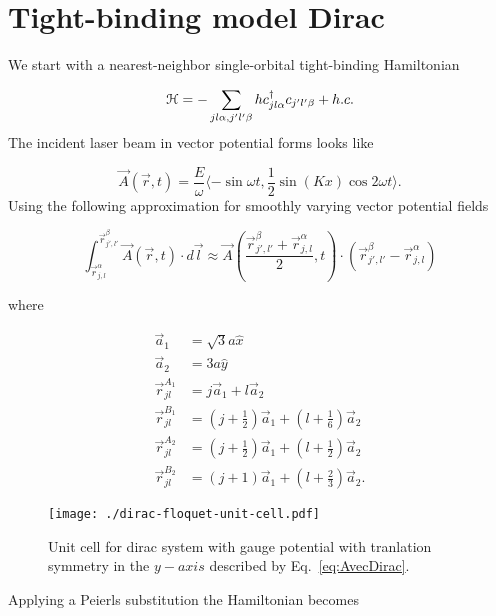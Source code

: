 \section{Tight-binding model Dirac}\label{app:tbm-dirac}

We start with a nearest-neighbor single-orbital tight-binding Hamiltonian

\begin{equation}
  \mathcal{H} = - \sum_{jl\alpha,j'l'\beta} h c^{\dagger}_{jl\alpha} c_{j'l'\beta} + h.c.
\end{equation}
The incident laser beam in vector potential forms looks like

\begin{equation} \label{eq:AvecDirac}
  \vec{A}(\vec{r},t) = \dfrac{E}{\omega} \langle -\sin \omega t, \dfrac{1}{2} \sin(Kx) \cos 2\omega t \rangle.
\end{equation}
Using the following approximation for smoothly varying vector potential fields

\begin{equation}
  \int_{\vec{r}_{j,l}^{\alpha}} ^{\vec{r}_{j',l'}^{\beta}} \vec{A}(\vec{r},t) \cdot d\vec{l} \approx \vec{A} \left( \dfrac{ \vec{r}_{j',l'}^{\beta} + \vec{r}_{j,l}^{\alpha} }{2}, t \right) \cdot \left( \vec{r}_{j',l'}^{\beta} - \vec{r}_{j,l}^{\alpha} \right)
\end{equation}


where

\begin{align}
  \vec{a}_1 &= \sqrt{3}a\hat{x} \\
  \vec{a}_2 &= 3a\hat{y} \\
  \vec{r}_{jl}^{A_1} &= j\vec{a}_1 + l\vec{a}_2 \\
  \vec{r}_{jl}^{B_1} &= (j+\tfrac{1}{2})\vec{a}_1 + (l+\tfrac{1}{6})\vec{a}_2 \\
  \vec{r}_{jl}^{A_2} &= (j+\tfrac{1}{2})\vec{a}_1 + (l+\tfrac{1}{2})\vec{a}_2 \\
  \vec{r}_{jl}^{B_2} &= (j+1)\vec{a}_1 + (l+\tfrac{2}{3})\vec{a}_2.
\end{align}

\begin{figure}[h]
  \texttt{[image: ./dirac-floquet-unit-cell.pdf]}
\caption{Unit cell for dirac system with gauge potential with tranlation symmetry in the $y-axis$ described by Eq.~\eqref{eq:AvecDirac}.}
  \label{fig:dirac-floquet-unit-cell}
\end{figure}
Applying a Peierls substitution the Hamiltonian becomes

